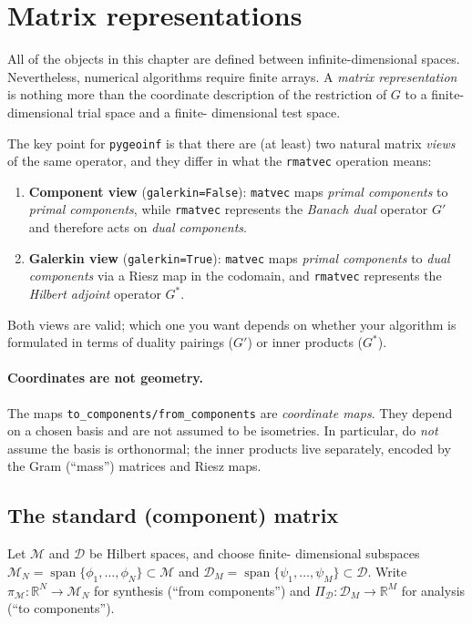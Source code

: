 \documentclass[11pt,twoside,openright]{book}
\theoremstyle{plain}
\theoremstyle{definition}
\theoremstyle{remark}
\newcommand{\modelspace}{\mathcal{M}}
\newcommand{\dataspace}{\mathcal{D}}
\DeclareMathOperator{\spn}{span}
\begin{document}
\section{Matrix representations}
\label{sec:matrix-representations}

All of the objects in this chapter are defined between infinite-dimensional
spaces. Nevertheless, numerical algorithms require finite arrays. A
\emph{matrix representation} is nothing more than the coordinate description of
the restriction of $G$ to a finite-dimensional trial space and a finite-
dimensional test space.

The key point for \texttt{pygeoinf} is that there are (at least) two natural
matrix \emph{views} of the same operator, and they differ in what the
\texttt{rmatvec} operation means:
\begin{enumerate}
  \item \textbf{Component view} (\texttt{galerkin=False}): \texttt{matvec} maps
    \emph{primal components} to \emph{primal components}, while \texttt{rmatvec}
    represents the \emph{Banach dual} operator $G'$ and therefore acts on
    \emph{dual components}.
  \item \textbf{Galerkin view} (\texttt{galerkin=True}): \texttt{matvec} maps
    \emph{primal components} to \emph{dual components} via a Riesz map in the
    codomain, and \texttt{rmatvec} represents the \emph{Hilbert adjoint}
    operator $G^*$.
\end{enumerate}

Both views are valid; which one you want depends on whether your algorithm is
formulated in terms of duality pairings ($G'$) or inner products ($G^*$).

\paragraph{Coordinates are not geometry.}
The maps \texttt{to\_components/from\_components} are \emph{coordinate maps}.
They depend on a chosen basis and are not assumed to be isometries. In
particular, do \emph{not} assume the basis is orthonormal; the inner products
live separately, encoded by the Gram (``mass'') matrices and Riesz maps.

\subsection{The standard (component) matrix}
\label{ssec:standard-matrix}

Let $\modelspace$ and $\dataspace$ be Hilbert spaces, and choose finite-
dimensional subspaces
\(
  \modelspace_N = \spn\{\phi_1,\ldots,\phi_N\} \subset \modelspace
\)
and
\(
  \dataspace_M = \spn\{\psi_1,\ldots,\psi_M\} \subset \dataspace.
\)
Write
\(\pi_{\modelspace}:\mathbb{R}^N\to\modelspace_N\) for synthesis
(``from components'') and
\(\Pi_{\dataspace}:\dataspace_M\to\mathbb{R}^M\) for analysis
(``to components'').
\end{document}
